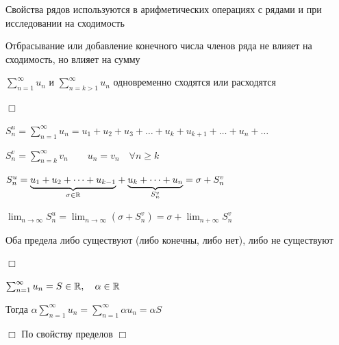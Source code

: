 \documentclass[12pt]{article}
\begin{document}
    \Notas Свойства рядов используются в арифметических операциях с рядами и при исследовании на сходимость

    \begin{MyTheorem}
         Отбрасывание или добавление конечного числа членов ряда не влияет на сходимость, но влияет на сумму

        $\sum_{n = 1}^\infty u_n$ и $\sum_{n = k > 1}^\infty u_n$ одновременно сходятся или расходятся
    \end{MyTheorem}

    \begin{tcolorbox}
        $\Box$

        $S^u_n = \sum_{n = 1}^{\infty} u_n = u_1 + u_2 + u_3 + \dots + u_k + u_{k + 1} + \dots + u_n + \dots$

        $S^v_n = \sum_{n = k}^\infty v_n \quad\quad u_n = v_n \quad \forall n \geq k$

        $S_n^u = \underset{\sigma \in \mathbb{R}}{\underbrace{u_1 + u_2 + \dots + u_{k - 1}}} + \underset{S^v_n}{\underbrace{u_{k} + \dots + u_n}} = \sigma + S^v_n$

        $\lim_{n \to \infty} S_n^u = \lim_{n \to \infty} (\sigma + S^v_n) = \sigma + \lim_{n + \infty} S_n^v$

        \smallvspace

        Оба предела либо существуют (либо конечны, либо нет), либо не существуют



        $\Box$
    \end{tcolorbox}

    \begin{MyTheorem}
         $\sum_{n = 1}^\infty u_n = S \in \mathbb{R}, \quad \alpha \in \mathbb{R}$

        Тогда $\alpha \sum_{n = 1}^\infty u_n = \sum_{n = 1}^\infty \alpha u_n = \alpha S$
    \end{MyTheorem}

    \begin{tcolorbox}
        $\Box$ По свойству пределов $\Box$
    \end{tcolorbox}
\end{document}
